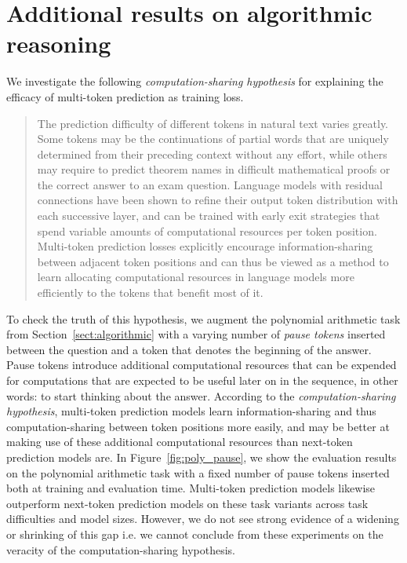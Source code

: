 \documentclass{article}
\theoremstyle{plain}
\theoremstyle{definition}
\theoremstyle{remark}
\begin{document}
\section{Additional results on algorithmic reasoning}
\label{app:poly}
We investigate the following \emph{computation-sharing hypothesis} for explaining the efficacy of multi-token prediction as training loss.
\begin{quote}
    The prediction difficulty of different tokens in natural text varies greatly. Some tokens may be the continuations of partial words that are uniquely determined from their preceding context without any effort, while others may require to predict theorem names in difficult mathematical proofs or the correct answer to an exam question. Language models with residual connections have been shown to refine their output token distribution with each successive layer, and can be trained with early exit strategies that spend variable amounts of computational resources per token position. Multi-token prediction losses explicitly encourage information-sharing between adjacent token positions and can thus be viewed as a method to learn allocating computational resources in language models more efficiently to the tokens that benefit most of it.
\end{quote}
To check the truth of this hypothesis, we augment the polynomial arithmetic task from Section~\ref{sect:algorithmic} with a varying number of \emph{pause tokens} \citep{goyal2023think} inserted between the question and a token that denotes the beginning of the answer. Pause tokens introduce additional computational resources that can be expended for computations that are expected to be useful later on in the sequence, in other words: to start thinking about the answer. According to the \emph{computation-sharing hypothesis}, multi-token prediction models learn information-sharing and thus computation-sharing between token positions more easily, and may be better at making use of these additional computational resources than next-token prediction models are. In Figure~\ref{fig:poly_pause}, we show the evaluation results on the polynomial arithmetic task with a fixed number of pause tokens inserted both at training and evaluation time. Multi-token prediction models likewise outperform next-token prediction models on these task variants across task difficulties and model sizes. However, we do not see strong evidence of a widening or shrinking of this gap i.e. we cannot conclude from these experiments on the veracity of the computation-sharing hypothesis.
\end{document}
